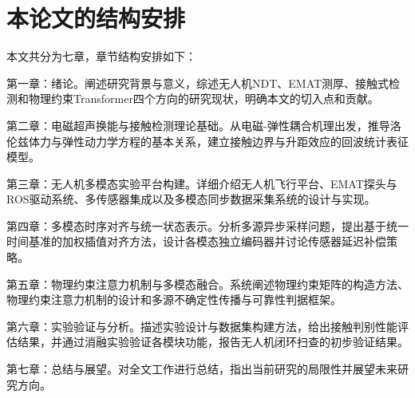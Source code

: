 \section{本论文的结构安排}

本文共分为七章，章节结构安排如下：

第一章：绪论。阐述研究背景与意义，综述无人机NDT、EMAT测厚、接触式检测和物理约束Transformer四个方向的研究现状，明确本文的切入点和贡献。

第二章：电磁超声换能与接触检测理论基础。从电磁-弹性耦合机理出发，推导洛伦兹体力与弹性动力学方程的基本关系，建立接触边界与升距效应的回波统计表征模型。

第三章：无人机多模态实验平台构建。详细介绍无人机飞行平台、EMAT探头与ROS驱动系统、多传感器集成以及多模态同步数据采集系统的设计与实现。

第四章：多模态时序对齐与统一状态表示。分析多源异步采样问题，提出基于统一时间基准的加权插值对齐方法，设计各模态独立编码器并讨论传感器延迟补偿策略。

第五章：物理约束注意力机制与多模态融合。系统阐述物理约束矩阵的构造方法、物理约束注意力机制的设计和多源不确定性传播与可靠性判据框架。

第六章：实验验证与分析。描述实验设计与数据集构建方法，给出接触判别性能评估结果，并通过消融实验验证各模块功能，报告无人机闭环扫查的初步验证结果。

第七章：总结与展望。对全文工作进行总结，指出当前研究的局限性并展望未来研究方向。
